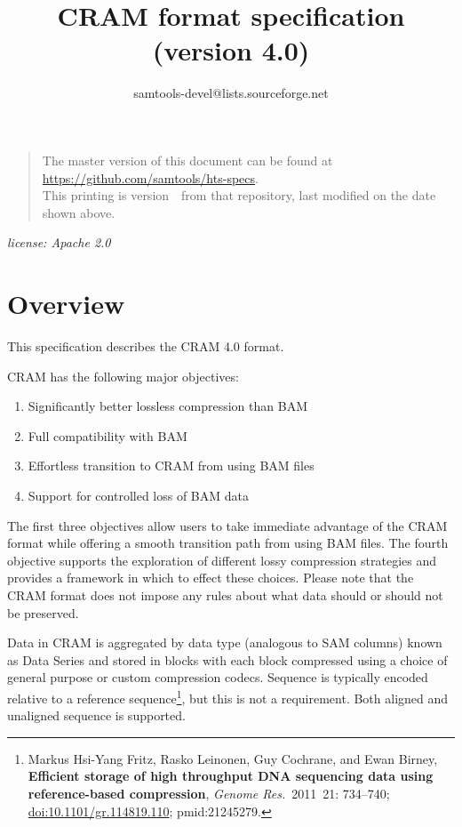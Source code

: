 \documentclass[a4paper]{article}
\begin{document}

\title{CRAM format specification (version 4.0)}
\author{samtools-devel@lists.sourceforge.net}
\date{\headdate}
\maketitle


\begin{quote}\small
The master version of this document can be found at
\url{https://github.com/samtools/hts-specs}.\\
This printing is version~\commitdesc\ from that repository,
last modified on the date shown above.
\end{quote}

\begin{center}
\textit{license: Apache 2.0}
\end{center}
\vspace*{1em}

\tableofcontents
\newpage

\section{Overview}

This specification describes the CRAM 4.0 format. 

CRAM has the following major objectives:

\begin{enumerate}
\item Significantly better lossless compression than BAM

\item Full compatibility with BAM

\item Effortless transition to CRAM from using BAM files

\item Support for controlled loss of BAM data
\end{enumerate}

The first three objectives allow users to take immediate advantage of the CRAM 
format while offering a smooth transition path from using BAM files. The fourth 
objective supports the exploration of different lossy compression strategies and 
provides a framework in which to effect these choices. Please note that the CRAM 
format does not impose any rules about what data should or should not be preserved. 

Data in CRAM is aggregated by data type (analogous to SAM columns)
known as Data Series and stored in blocks with each block compressed
using a choice of general purpose or custom compression codecs.
Sequence is typically encoded relative to a reference
sequence\footnote{Markus Hsi-Yang Fritz, Rasko Leinonen, Guy Cochrane,
  and Ewan Birney, \textbf{Efficient storage of high throughput DNA
    sequencing data using reference-based compression}, {\sl Genome
    Res.}~2011~21: 734--740;
  \href{http://dx.doi.org/doi:10.1101/gr.114819.110}{doi:10.1101/gr.114819.110};
  {\sc pmid:}21245279.}, but this is not a requirement.  Both aligned
and unaligned sequence is supported.
\end{document}
